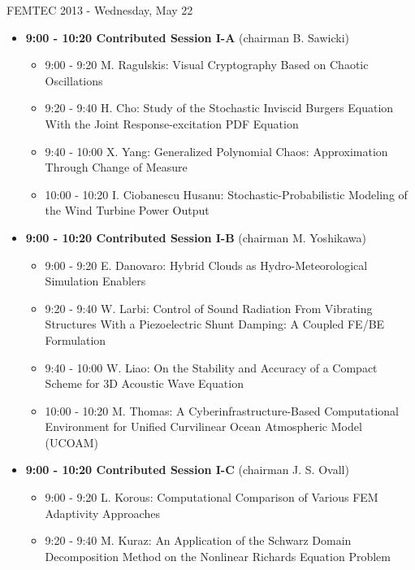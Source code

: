 \documentclass[10pt, A4]{article}%
\begin{document}
\begin{itemize}
\end{itemize}

\newpage

\centerline{\huge FEMTEC 2013 - Wednesday, May 22}
\vspace{4mm}

\begin{itemize}    
  \item {\bf 9:00 - 10:20 Contributed Session I-A} (chairman B. Sawicki) 
  \begin{itemize}
    \item 9:00 - 9:20 {M. Ragulskis}: {Visual Cryptography Based on Chaotic Oscillations}  %
    \item 9:20 - 9:40 {H. Cho}: {Study of the Stochastic Inviscid Burgers Equation With the Joint Response-excitation PDF Equation}
    \item 9:40 - 10:00 {X. Yang}: {Generalized Polynomial Chaos: Approximation Through Change of Measure}
    \item 10:00 - 10:20 {I. Ciobanescu Husanu}: {Stochastic-Probabilistic Modeling of the Wind Turbine Power Output}
  \end{itemize}
  \item {\bf 9:00 - 10:20 Contributed Session I-B} (chairman M. Yoshikawa) 
  \begin{itemize}
    \item 9:00 - 9:20 {E. Danovaro}: {Hybrid Clouds as Hydro-Meteorological Simulation Enablers}
    \item 9:20 - 9:40 {W. Larbi}: {Control of Sound Radiation From Vibrating Structures With a Piezoelectric Shunt Damping: A Coupled FE/BE Formulation}
    \item 9:40 - 10:00 {W. Liao}: {On the Stability and Accuracy of a Compact Scheme for 3D Acoustic Wave Equation}
    \item 10:00 - 10:20 {M. Thomas}: {A Cyberinfrastructure-Based Computational Environment for Unified Curvilinear Ocean Atmospheric Model  (UCOAM)}
  \end{itemize}
    \item {\bf 9:00 - 10:20 Contributed Session I-C} (chairman J. S. Ovall) 
  \begin{itemize}
    \item 9:00 - 9:20 {L. Korous}: {Computational Comparison of Various FEM Adaptivity Approaches}
    \item 9:20 - 9:40 {M. Kuraz}: {An Application of the Schwarz Domain Decomposition Method on the Nonlinear Richards Equation Problem}

\end{itemize}
\end{itemize}
\end{document}
